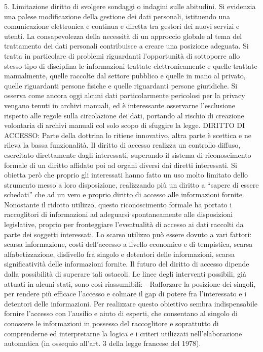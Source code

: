 5.	Limitazione diritto di svolgere sondaggi o indagini sulle abitudini.
Si evidenzia una palese modificazione della gestione dei dati personali, istituendo una comunicazione elettronica e continua e diretta tra gestori dei nuovi servizi e utenti.
La consapevolezza della necessità di un approccio globale al tema del trattamento dei dati personali contribuisce a creare una posizione adeguata. Si tratta in particolare di problemi riguardanti l’opportunità di sottoporre allo stesso tipo di disciplina le informazioni trattate elettronicamente e quelle trattate manualmente, quelle raccolte dal settore pubblico e quelle in mano al privato, quelle riguardanti persone fisiche e quelle riguardanti persone giuridiche.
Si osserva come ancora oggi alcuni dati particolarmente pericolosi per la privacy vengano tenuti in archivi manuali, ed è interessante osservarne l’esclusione rispetto alle regole sulla circolazione dei dati, portando al rischio di creazione volontaria di archivi manuali col solo scopo di sfuggire la legge.
DIRITTO DI ACCESSO:
Parte della dottrina lo ritiene innovativo, altra parte è scettica e ne rileva la bassa funzionalità.
Il diritto di accesso realizza un controllo diffuso, esercitato direttamente dagli interessati, superando il sistema di riconoscimento formale di un diritto affidato poi ad organi diversi dai diretti interessati. Si obietta però che proprio gli interessati hanno fatto un uso molto limitato dello strumento messo a loro disposizione, realizzando più un diritto a “sapere di essere schedati” che ad un vero e proprio diritto di accesso alle informazioni fornite. Nonostante il ridotto utilizzo, questo riconoscimento formale ha portato i raccoglitori di informazioni ad adeguarsi spontaneamente alle disposizioni legislative, proprio per fronteggiare l’eventualità di accesso ai dati raccolti da parte dei soggetti interessati. Lo scarso utilizzo può essere dovuto a vari fattori: scarsa informazione, costi dell’accesso a livello economico e di tempistica, scarsa alfabetizzazione, dislivello fra singolo e detentori delle informazioni, scarsa significatività delle informazioni fornite. Il futuro del diritto di accesso dipende dalla possibilità di superare tali ostacoli. Le linee degli interventi possibili, già attuati in alcuni stati, sono così riassumibili:
-	Rafforzare la posizione dei singoli, per rendere più efficace l’accesso e colmare il gap di potere fra l’interessato e i detentori delle informazioni. Per realizzare questo obiettivo sembra indispensabile fornire l’accesso con l’ausilio e aiuto di esperti, che consentano al singolo di conoscere le informazioni in possesso del raccoglitore e soprattutto di comprenderne ed interpretarne la logica e i criteri utilizzati nell’elaborazione automatica (in ossequio all’art. 3 della legge francese del 1978).
